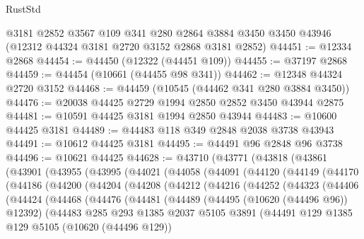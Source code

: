 \begin{lexlean}{RustStd}
\begin{coremodule}
    @3181
    @2852
    @3567
    @109
    @341
    @280
    @2864
    @3884
    @3450
    @3450
    @43946
    (@12312 @44324 @3181 @2720 @3152 @2868 @3181 @2852)
@44451 := @12334 @2868
@44454 := @44450 (@12322 (@44451 @109))
@44455 := @37197 @2868
@44459 := @44454 (@10661 (@44455 @98 @341))
@44462 := @12348 @44324 @2720 @3152
@44468 := @44459 (@10545 (@44462 @341 @280 @3884 @3450))
@44476 := @20038 @44425 @2729 @1994 @2850 @2852 @3450 @43944 @2875
@44481 := @10591 @44425 @3181 @1994 @2850 @43944
@44483 := @10600 @44425 @3181
@44489 := @44483 @118 @349 @2848 @2038 @3738 @43943
@44491 := @10612 @44425 @3181
@44495 := @44491 @96 @2848 @96 @3738
@44496 := @10621 @44425
@44628 := @43710
    (@43771
      (@43818
        (@43861
          (@43901
            (@43955
              (@43995
                (@44021
                  (@44058
                    (@44091
                      (@44120
                        (@44149
                          (@44170
                            (@44186
                              (@44200
                                (@44204
                                  (@44208
                                    (@44212
                                      (@44216
                                        (@44252
                                          (@44323
                                            (@44406
                                              (@44424
                                                (@44468
                                                  (@44476
                                                    (@44481
                                                      (@44489
                                                        (@44495 (@10620 (@44496 @96)) @12392)
                                                        (@44483
                                                          @285
                                                          @293
                                                          @1385
                                                          @2037
                                                          @5105
                                                          @3891
                                                          (@44491
                                                            @129
                                                            @1385
                                                            @129
                                                            @5105
                                                            (@10620 (@44496 @129))

\end{coremodule}
\end{lexlean}
